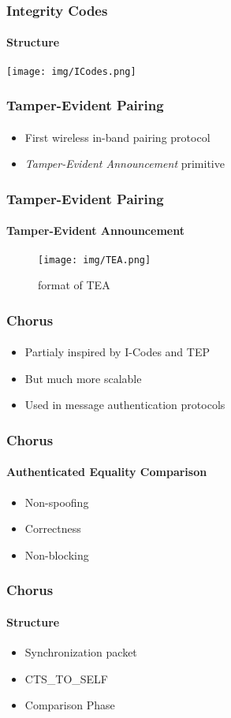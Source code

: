 \documentclass{beamer}
\begin{document}
\begin{frame}
	\frametitle{Integrity Codes}
	\framesubtitle{Structure}
	\texttt{[image: img/ICodes.png]}
\end{frame}

\begin{frame}
	\frametitle{Tamper-Evident Pairing}
	\framesubtitle{}
	\begin{itemize}
		\item First wireless in-band pairing protocol
		\item \textit{Tamper-Evident Announcement} primitive
	\end{itemize}
\end{frame}

\begin{frame}
	\frametitle{Tamper-Evident Pairing}
	\framesubtitle{Tamper-Evident Announcement}
	\begin{figure}
		\centering
		\texttt{[image: img/TEA.png]}
		\caption{format of TEA}
		\label{fig:tea}
	\end{figure}
\end{frame}

\begin{frame}
	\frametitle{Chorus}
	\framesubtitle{}
	\begin{itemize}
		\item Partialy inspired by I-Codes and TEP
		\item But much more scalable
		\item Used in message authentication protocols 
	\end{itemize}
\end{frame}

\begin{frame}
	\frametitle{Chorus}
	\framesubtitle{Authenticated Equality Comparison}
	\begin{itemize}
		\item Non-spoofing 
		\item Correctness
		\item Non-blocking
	\end{itemize}
\end{frame}

\begin{frame}
	\frametitle{Chorus}
	\framesubtitle{Structure}
	\begin{itemize}
		\item Synchronization packet 
		\item CTS\_TO\_SELF
		\item Comparison Phase
	\end{itemize}
\end{frame}
\end{document}
